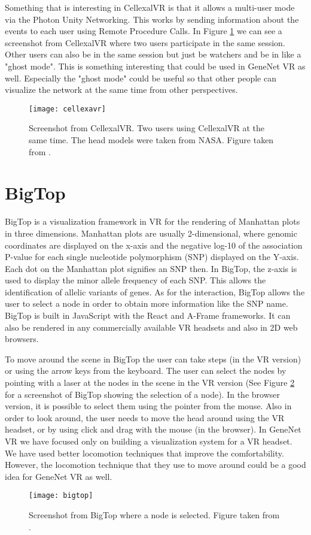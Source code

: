 Something that is interesting in CellexalVR is that it allows a multi-user mode via the Photon Unity Networking. This works by sending information about the events to each user using Remote Procedure Calls. In Figure \ref{fig:cellexavr} we can see a screenshot from CellexalVR where two users participate in the same session. Other users can also be in the same session but just be watchers and be in like a "ghost mode". This is something interesting that could be used in GeneNet VR as well. Especially the "ghost mode" could be useful so that other people can visualize the network at the same time from other perspectives.

\begin{figure}[h!]
    \centering%
    \texttt{[image: cellexavr]}
    \caption{Screenshot from CellexalVR. Two users using CellexalVR at the same time. The head models were taken from NASA. Figure taken from \cite{cellexalvr}.}
    \label{fig:cellexavr}
\end{figure}%

\section{BigTop}
BigTop is a visualization framework in VR for the rendering of Manhattan plots in three dimensions\cite{bigtop}. Manhattan plots are usually 2-dimensional, where genomic coordinates are displayed on the x-axis and the negative log-10 of the association P-value for each single nucleotide polymorphism (SNP) displayed on the Y-axis. Each dot on the Manhattan plot signifies an SNP then. In BigTop, the z-axis is used to display the minor allele frequency of each SNP. This allows the identification of allelic variants of genes. As for the interaction, BigTop allows the user to select a node in order to obtain more information like the SNP name. BigTop is built in JavaScript with the React and A-Frame frameworks. It can also be rendered in any commercially available VR headsets and also in 2D web browsers.

To move around the scene in BigTop the user can take steps (in the VR version) or using the arrow keys from the keyboard. The user can select the nodes by pointing with a laser at the nodes in the scene in the VR version (See Figure \ref{fig:bigtop} for a screenshot of BigTop showing the selection of a node). In the browser version, it is possible to select them using the pointer from the mouse. Also in order to look around, the user needs to move the head around using the VR headset, or by using click and drag with the mouse (in the browser). In GeneNet VR we have focused only on building a visualization system for a VR headset. We have used better locomotion techniques that improve the comfortability. However, the locomotion technique that they use to move around could be a good idea for GeneNet VR as well.

\begin{figure}[h!]
    \centering%
    \texttt{[image: bigtop]}
    \caption{Screenshot from BigTop where a node is selected. Figure taken from \cite{bigtop}.}
    \label{fig:bigtop}
\end{figure}%
